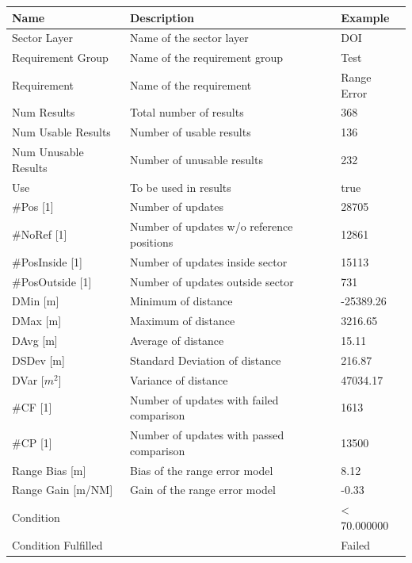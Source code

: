 \begin{center}
 \begin{table}[H]
  \begin{tabularx}{\textwidth}{ | l | X |  l | }
    \hline
    \textbf{Name} & \textbf{Description} & \textbf{Example} \\ \hline
  Sector Layer & Name of the sector layer & DOI \\ \hline
  Requirement Group & Name of the requirement group & Test \\ \hline
  Requirement & Name of the requirement & Range Error \\ \hline
  Num Results & Total number of results & 368 \\ \hline
  Num Usable Results & Number of usable results & 136 \\ \hline
  Num Unusable Results & Number of unusable results & 232 \\ \hline
  Use & To be used in results & true \\ \hline
  \#Pos [1] & Number of updates & 28705 \\ \hline
  \#NoRef [1] & Number of updates w/o reference positions & 12861 \\ \hline
  \#PosInside [1] & Number of updates inside sector & 15113 \\ \hline
  \#PosOutside [1] & Number of updates outside sector & 731 \\ \hline
  DMin [m] & Minimum of distance & -25389.26 \\ \hline
  DMax [m] & Maximum of distance & 3216.65 \\ \hline
  DAvg [m] & Average of distance & 15.11 \\ \hline
  DSDev [m] & Standard Deviation of distance & 216.87 \\ \hline
  DVar [$m^2$] & Variance of distance & 47034.17 \\ \hline
  \#CF [1] & Number of updates with failed comparison & 1613 \\ \hline
  \#CP [1] & Number of updates with passed comparison  & 13500 \\ \hline
  Range Bias [m] & Bias of the range error model & 8.12 \\ \hline
  Range Gain [m/NM] & Gain of the range error model & -0.33 \\ \hline
  Condition &  & < 70.000000 \\ \hline
  Condition Fulfilled &  & Failed \\ \hline

\end{tabularx}
\end{table}
\end{center}


